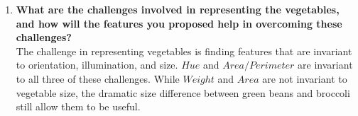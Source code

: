 \documentclass[12pt]{article}
\begin{document}
\begin{enumerate}
\begin{enumerate}
  \item \textbf{What are the challenges involved in representing the vegetables, and how will the features you proposed help in overcoming these challenges?} \\
    The challenge in representing vegetables is finding features that are invariant to orientation, illumination, and size. $Hue$ and $Area/Perimeter$ are invariant to all three of these challenges. While $Weight$ and $Area$ are not invariant to vegetable size, the dramatic size difference between green beans and broccoli still allow them to be useful.
  \end{enumerate}
\end{enumerate}

 
 
\end{document}
